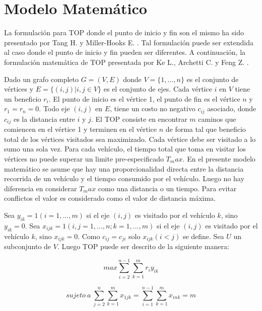\chapter{Modelo Matemático}

La formulación para TOP donde el punto de inicio y fin son el mismo ha sido presentado por Tang H. y Miller-Hooks E. \cite{TangMillerHooks}. Tal formulación puede ser extendida al caso donde el punto de inicio y fin pueden ser diferentes. A continuación, la formulación matemática de TOP presentada por Ke L., Archetti C. y Feng Z. \cite{KeArchettiFeng}.

\bigskip

Dado un grafo completo $G=(V,E)$ donde $V=\{1,...,n\}$ es el conjunto de vértices y $E=\{(i,j)|i,j \in V\}$ es el conjunto de ejes. Cada vértice $i$ en $V$ tiene un beneficio $r_i$. El punto de inicio es el vértice 1, el punto de fin es el vértice $n$ y $r_1=r_n=0$. Todo eje $(i,j)$ en $E$, tiene un costo no negativo $c_{ij}$ asociado, donde $c_{ij}$ es la distancia entre $i$ y $j$. El TOP consiste en encontrar $m$ caminos que comiencen en el vértice 1 y terminen en el vértice $n$ de forma tal que beneficio total de los vértices visitados sea maximizado. Cada vértice debe ser visitado a lo sumo una sola vez. Para cada vehículo, el tiempo total que toma en visitar los vértices no puede superar un limite pre-especificado $T_max$. En el presente modelo matemático se asume que hay una proporcionalidad directa entre la distancia recorrida de un vehículo y el tiempo consumido por el vehículo. Luego no hay diferencia en considerar $T_max$ como una distancia o un tiempo. Para evitar conflictos el valor es considerado como el valor de distancia máxima.

\bigskip

Sea $y_{ik} = 1 (i = 1,...,m)$ si el eje $(i,j)$ es visitado por el vehículo $k$, sino $y_{ik} = 0$. Sea $x_{ijk} = 1 (i,j = 1,...,n; k=1,...,m)$ si el eje $(i,j)$ es visitado por el vehículo $k$, sino $x_{ijk} = 0$. Como $c_{ij}=c_{ji}$ solo $x_{ijk}(i<j)$ se define. Sea $U$ un subconjunto de $V$. Luego TOP puede ser descrito de la siguiente manera:

\bigskip

\begin{equation}
max \sum_{i=2}^{n-1} \sum_{k=1}^{m} r_i y_{ik}
\end{equation}

\begin{equation} \label{eq:modelo2}
sujeto \ a \ \sum_{j=2}^{n} \sum_{k=1}^{m} x_{1jk} = \sum_{i=1}^{n-1} \sum_{k=1}^{m} x_{ink} = m
\end{equation}

